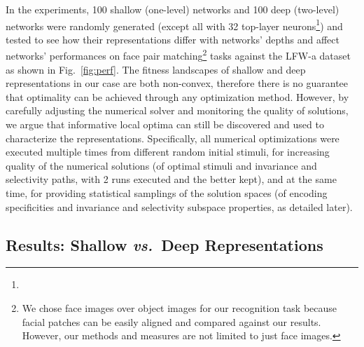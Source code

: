 \documentclass[10pt,twocolumn,letterpaper]{article}
\begin{document}
\newcommand{\exptask}{We chose face images over object images for our recognition task because facial patches can be easily aligned and compared against our results. However, our methods and measures are not limited to just face images.}

In the experiments, 100 shallow (\ie one-level) networks and 100 deep (\ie two-level) networks {were} randomly generated (except all with 32 top-layer neurons\footnote{\expsettings}) and tested to see how their representations differ with networks' depths and affect networks' performances on face pair matching\footnote{\exptask} tasks against the LFW-a dataset \cite{LFWTech, wolf2011effective} as shown in Fig.~\ref{fig:perf}. %
The fitness landscapes of shallow and deep representations in our case are both non-convex, therefore there is no guarantee that optimality can be achieved through any optimization method.
However, by carefully adjusting the numerical solver and monitoring the quality of solutions, we argue that informative local optima can still be discovered and used to characterize the representations.
Specifically, all numerical optimizations {were} executed multiple times from different random initial stimuli, for increasing quality of the numerical solutions (of optimal stimuli and invariance and selectivity paths, with 2 runs executed and the better kept), and at the same time, for providing statistical samplings of the solution spaces (of encoding specificities and invariance and selectivity subspace properties, as detailed later).


\subsection{Results: Shallow \textbf{\textit{vs.}}~Deep Representations}
\end{document}
